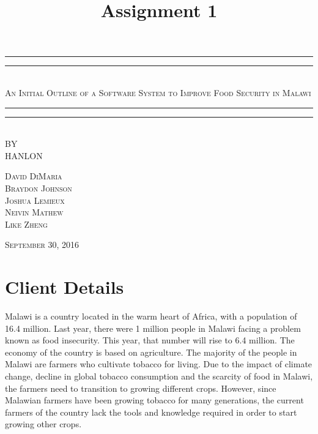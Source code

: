 \documentclass[12pt,letterpaper]{article}
\title{Assignment 1}
\begin{document}
\begin{titlepage}
    \centering
    \vspace*{\baselineskip}
    \rule{\textwidth}{1.6pt}\vspace*{-\baselineskip}\vspace*{2pt}
    \rule{\textwidth}{0.4pt}\\[1.5\baselineskip]
    {\LARGE \textsc{An Initial Outline of a Software System to Improve Food Security in Malawi}}\\[\baselineskip]
	\rule{\textwidth}{0.4pt}\vspace*{-\baselineskip}\vspace{4pt}    
    \rule{\textwidth}{2pt}\\[2\baselineskip]
   
    \vspace*{5\baselineskip}
    \textsc{BY}\\[0.25\baselineskip]
    {\LARGE HANLON} \\
    
    \vspace*{\baselineskip}
    {\textsc{David DiMaria \\ Braydon Johnson \\ Joshua Lemieux \\ Neivin Mathew \\ Like Zheng} \par}
    \vfill
    {\scshape September 30, 2016} \\
  \end{titlepage}
  
  
\tableofcontents
\lhead{} %
\clearpage
{} %
    
\section{Client Details}
Malawi is a country located in the warm heart of Africa, with a population of 16.4 million. Last year, there were 1 million people in Malawi facing a problem known as food insecurity. This year, that number will rise to 6.4 million. The economy of the country is based on agriculture. The majority of the people in Malawi are farmers who cultivate tobacco for living. Due to the impact of climate change, decline in global tobacco consumption and the scarcity of food in Malawi, the farmers need to transition to growing different crops. However, since Malawian farmers have been growing tobacco for many generations, the current farmers of the country lack the tools and knowledge required in order to start growing other crops. 
\end{document}
